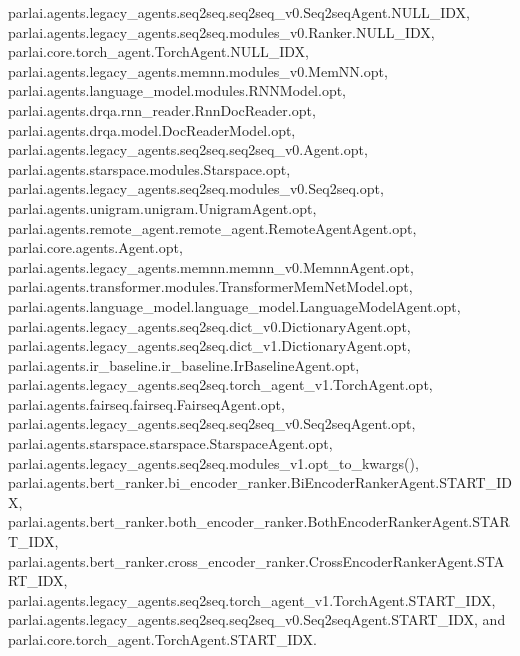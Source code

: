 parlai.\+agents.\+legacy\+\_\+agents.\+seq2seq.\+seq2seq\+\_\+v0.\+Seq2seq\+Agent.\+N\+U\+L\+L\+\_\+\+I\+DX, parlai.\+agents.\+legacy\+\_\+agents.\+seq2seq.\+modules\+\_\+v0.\+Ranker.\+N\+U\+L\+L\+\_\+\+I\+DX, parlai.\+core.\+torch\+\_\+agent.\+Torch\+Agent.\+N\+U\+L\+L\+\_\+\+I\+DX, parlai.\+agents.\+legacy\+\_\+agents.\+memnn.\+modules\+\_\+v0.\+Mem\+N\+N.\+opt, parlai.\+agents.\+language\+\_\+model.\+modules.\+R\+N\+N\+Model.\+opt, parlai.\+agents.\+drqa.\+rnn\+\_\+reader.\+Rnn\+Doc\+Reader.\+opt, parlai.\+agents.\+drqa.\+model.\+Doc\+Reader\+Model.\+opt, parlai.\+agents.\+legacy\+\_\+agents.\+seq2seq.\+seq2seq\+\_\+v0.\+Agent.\+opt, parlai.\+agents.\+starspace.\+modules.\+Starspace.\+opt, parlai.\+agents.\+legacy\+\_\+agents.\+seq2seq.\+modules\+\_\+v0.\+Seq2seq.\+opt, parlai.\+agents.\+unigram.\+unigram.\+Unigram\+Agent.\+opt, parlai.\+agents.\+remote\+\_\+agent.\+remote\+\_\+agent.\+Remote\+Agent\+Agent.\+opt, parlai.\+core.\+agents.\+Agent.\+opt, parlai.\+agents.\+legacy\+\_\+agents.\+memnn.\+memnn\+\_\+v0.\+Memnn\+Agent.\+opt, parlai.\+agents.\+transformer.\+modules.\+Transformer\+Mem\+Net\+Model.\+opt, parlai.\+agents.\+language\+\_\+model.\+language\+\_\+model.\+Language\+Model\+Agent.\+opt, parlai.\+agents.\+legacy\+\_\+agents.\+seq2seq.\+dict\+\_\+v0.\+Dictionary\+Agent.\+opt, parlai.\+agents.\+legacy\+\_\+agents.\+seq2seq.\+dict\+\_\+v1.\+Dictionary\+Agent.\+opt, parlai.\+agents.\+ir\+\_\+baseline.\+ir\+\_\+baseline.\+Ir\+Baseline\+Agent.\+opt, parlai.\+agents.\+legacy\+\_\+agents.\+seq2seq.\+torch\+\_\+agent\+\_\+v1.\+Torch\+Agent.\+opt, parlai.\+agents.\+fairseq.\+fairseq.\+Fairseq\+Agent.\+opt, parlai.\+agents.\+legacy\+\_\+agents.\+seq2seq.\+seq2seq\+\_\+v0.\+Seq2seq\+Agent.\+opt, parlai.\+agents.\+starspace.\+starspace.\+Starspace\+Agent.\+opt, parlai.\+agents.\+legacy\+\_\+agents.\+seq2seq.\+modules\+\_\+v1.\+opt\+\_\+to\+\_\+kwargs(), parlai.\+agents.\+bert\+\_\+ranker.\+bi\+\_\+encoder\+\_\+ranker.\+Bi\+Encoder\+Ranker\+Agent.\+S\+T\+A\+R\+T\+\_\+\+I\+DX, parlai.\+agents.\+bert\+\_\+ranker.\+both\+\_\+encoder\+\_\+ranker.\+Both\+Encoder\+Ranker\+Agent.\+S\+T\+A\+R\+T\+\_\+\+I\+DX, parlai.\+agents.\+bert\+\_\+ranker.\+cross\+\_\+encoder\+\_\+ranker.\+Cross\+Encoder\+Ranker\+Agent.\+S\+T\+A\+R\+T\+\_\+\+I\+DX, parlai.\+agents.\+legacy\+\_\+agents.\+seq2seq.\+torch\+\_\+agent\+\_\+v1.\+Torch\+Agent.\+S\+T\+A\+R\+T\+\_\+\+I\+DX, parlai.\+agents.\+legacy\+\_\+agents.\+seq2seq.\+seq2seq\+\_\+v0.\+Seq2seq\+Agent.\+S\+T\+A\+R\+T\+\_\+\+I\+DX, and parlai.\+core.\+torch\+\_\+agent.\+Torch\+Agent.\+S\+T\+A\+R\+T\+\_\+\+I\+DX.

